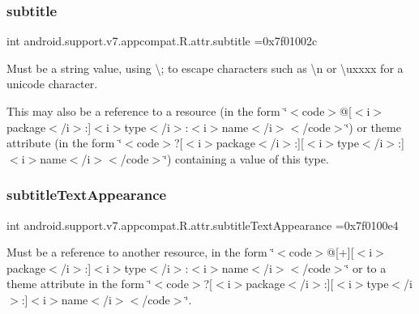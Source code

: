 \subsubsection{\texorpdfstring{subtitle}{subtitle}}
{\footnotesize\ttfamily int android.\+support.\+v7.\+appcompat.\+R.\+attr.\+subtitle =0x7f01002c\hspace{0.3cm}{\ttfamily [static]}}

Must be a string value, using \textquotesingle{}\textbackslash{};\textquotesingle{} to escape characters such as \textquotesingle{}\textbackslash{}n\textquotesingle{} or \textquotesingle{}\textbackslash{}uxxxx\textquotesingle{} for a unicode character. 

This may also be a reference to a resource (in the form \char`\"{}$<$code$>$@\mbox{[}$<$i$>$package$<$/i$>$\+:\mbox{]}$<$i$>$type$<$/i$>$\+:$<$i$>$name$<$/i$>$$<$/code$>$\char`\"{}) or theme attribute (in the form \char`\"{}$<$code$>$?\mbox{[}$<$i$>$package$<$/i$>$\+:\mbox{]}\mbox{[}$<$i$>$type$<$/i$>$\+:\mbox{]}$<$i$>$name$<$/i$>$$<$/code$>$\char`\"{}) containing a value of this type. \mbox{\label{classandroid_1_1support_1_1v7_1_1appcompat_1_1R_1_1attr_af922e4bc81d4e0f520259565bba0d869}} 
\subsubsection{\texorpdfstring{subtitle\+Text\+Appearance}{subtitleTextAppearance}}
{\footnotesize\ttfamily int android.\+support.\+v7.\+appcompat.\+R.\+attr.\+subtitle\+Text\+Appearance =0x7f0100e4\hspace{0.3cm}{\ttfamily [static]}}

Must be a reference to another resource, in the form \char`\"{}$<$code$>$@\mbox{[}+\mbox{]}\mbox{[}$<$i$>$package$<$/i$>$\+:\mbox{]}$<$i$>$type$<$/i$>$\+:$<$i$>$name$<$/i$>$$<$/code$>$\char`\"{} or to a theme attribute in the form \char`\"{}$<$code$>$?\mbox{[}$<$i$>$package$<$/i$>$\+:\mbox{]}\mbox{[}$<$i$>$type$<$/i$>$\+:\mbox{]}$<$i$>$name$<$/i$>$$<$/code$>$\char`\"{}. \mbox{\label{classandroid_1_1support_1_1v7_1_1appcompat_1_1R_1_1attr_aa13ebb30d6c238f765d0bf427fec0c76}} 
